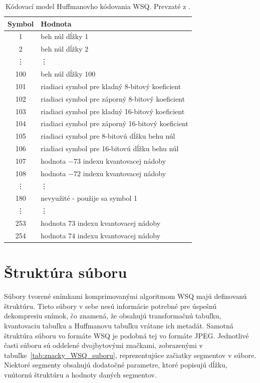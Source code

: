   \begin{table}[ht]
    \centering
    \caption{Kódovací model Huffmanovho kódovania WSQ. Prevzaté z \cite{WSQSpecification}.}
    \begin{tabular}{| c  l |}
      \hline
      \textbf{Symbol} & \textbf{Hodnota} \\
      \hline
      1 & beh núl dĺžky 1 \\
      2 & beh núl dĺžky 2 \\
      \vdots & \vdots \\
      100 & beh núl dĺžky 100 \\
      101 & riadiaci symbol pre kladný 8-bitový koeficient  \\
      102 & riadiaci symbol pre záporný 8-bitový koeficient \\
      103 & riadiaci symbol pre kladný 16-bitový koeficient \\
      104 & riadiaci symbol pre záporný 16-bitový koeficient \\
      105 & riadiaci symbol pre 8-bitovú dĺžku behu núl \\
      106 & riadiaci symbol pre 16-bitovú dĺžku behu núl \\
      107 & hodnota $-73$ indexu kvantovacej nádoby \\
      108 & hodnota $-72$ indexu kvantovacej nádoby \\
      \vdots & \vdots \\
      180 & nevyužité - použije sa symbol 1 \\
      \vdots & \vdots \\
      253 & hodnota $73$ indexu kvantovacej nádoby \\
      254 & hodnota $74$ indexu kvantovacej nádoby \\
      \hline
    \end{tabular}
    \label{tab:kodovaci_model}
  \end{table}

  \section{Štruktúra súboru} \label{sec:struktura}
  Súbory tvorené snímkami komprimovanými algoritmom WSQ majú definovanú štruktúru. Tieto súbory v sebe nesú informácie potrebné pre úspešnú
  dekompresiu snímok, čo znamená, že obsahujú transformačnú tabuľku, kvantovaciu tabuľku a Huffmanovu tabuľku vrátane ich metadát.
  Samotná štruktúra súboru vo formáte WSQ je podobná tej vo formáte JPEG. Jednotlivé časti súboru sú oddelené dvojbytovými značkami,
  zobrazenými v tabuľke~\ref{tab:znacky_WSQ_suboru}, reprezentujúce začiatky segmentov v súbore. Niektoré segmenty obsahujú dodatočné parametre,
  ktoré popisujú dĺžku, vnútornú štruktúru a hodnoty daných segmentov.

